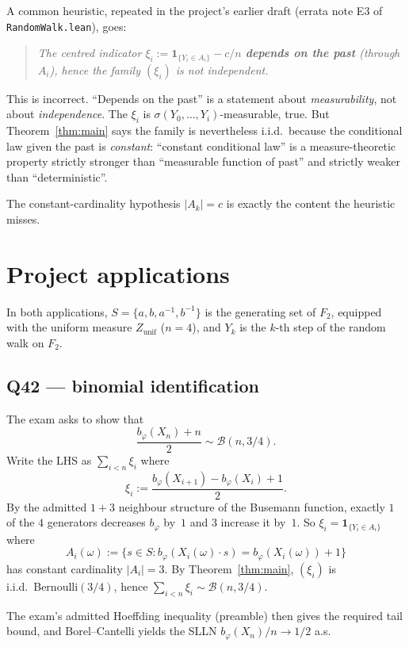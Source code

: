 \documentclass[11pt,a4paper]{article}
\newcommand{\one}{\mathbf{1}}
\theoremstyle{plain}
\theoremstyle{definition}
\theoremstyle{remark}
\begin{document}
A common heuristic, repeated in the project's earlier draft (errata
note E3 of \verb|RandomWalk.lean|), goes:

\begin{quote}\itshape
The centred indicator $\xi_i := \one_{\{Y_i \in A_i\}} - c/n$
\textbf{depends on the past} (through $A_i$), hence the family
$(\xi_i)$ is not independent.
\end{quote}

This is incorrect. ``Depends on the past'' is a statement about
\emph{measurability}, not about \emph{independence}. The
$\xi_i$ is $\sigma(Y_0, \dots, Y_i)$-measurable, true. But
Theorem~\ref{thm:main} says the family is nevertheless i.i.d.\
because the conditional law given the past is \emph{constant}:
``constant conditional law'' is a measure-theoretic property strictly
stronger than ``measurable function of past'' and strictly weaker
than ``deterministic''.

The constant-cardinality hypothesis $|A_k| = c$ is exactly the
content the heuristic misses.

\section{Project applications}\label{sec:applications}

In both applications, $S = \{a, b, a^{-1}, b^{-1}\}$ is the
generating set of $F_2$, equipped with the uniform measure
$Z_{\mathrm{unif}}$ ($n = 4$), and $Y_k$ is the $k$-th step of the
random walk on $F_2$.

\subsection{Q42 --- binomial identification}

The exam asks to show that
\[
  \frac{b_\varphi(X_n) + n}{2} \sim \mathcal{B}(n, 3/4).
\]
Write the LHS as $\sum_{i<n} \xi_i$ where
\[
  \xi_i := \frac{b_\varphi(X_{i+1}) - b_\varphi(X_i) + 1}{2}.
\]
By the admitted $1+3$ neighbour structure of the Busemann function,
exactly $1$ of the $4$ generators decreases $b_\varphi$ by~$1$ and $3$
increase it by~$1$. So $\xi_i = \one_{\{Y_i \in A_i\}}$ where
\[
  A_i(\omega) := \{ s \in S : b_\varphi(X_i(\omega) \cdot s)
    = b_\varphi(X_i(\omega)) + 1 \}
\]
has constant cardinality $|A_i| = 3$. By Theorem~\ref{thm:main},
$(\xi_i)$ is i.i.d.\ Bernoulli$(3/4)$, hence
$\sum_{i<n} \xi_i \sim \mathcal{B}(n, 3/4)$.

The exam's admitted Hoeffding inequality (preamble) then gives the
required tail bound, and Borel--Cantelli yields the SLLN
$b_\varphi(X_n)/n \to 1/2$ a.s.
\end{document}
